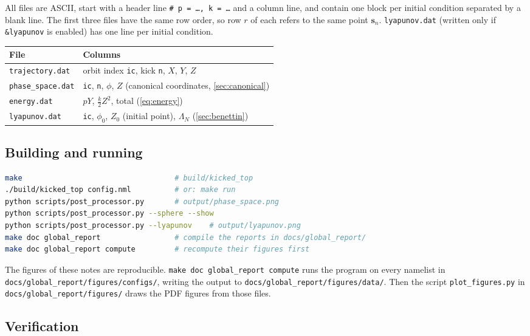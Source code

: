 \documentclass[11pt,a4paper]{article}
\newcommand{\vs}{\bm{s}}
\begin{document}
All files are ASCII, start with a header line \texttt{\# p = \dots, k = \dots} and a column line, and contain one
block per initial condition separated by a blank line. The first three files have the same row order, so row $r$ of
each refers to the same point $\vs_n$. \texttt{lyapunov.dat} (written only if \texttt{\&lyapunov} is enabled) has one line
per initial condition.
\begin{center}
\small
\begin{tabular}{ll}
  \toprule
  File & Columns \\
  \midrule
  \texttt{trajectory.dat} & orbit index \texttt{ic}, kick \texttt{n}, $X$, $Y$, $Z$ \\
  \texttt{phase\_space.dat} & \texttt{ic}, \texttt{n}, $\phi$, $Z$ \quad (canonical coordinates, \cref{sec:canonical}) \\
  \texttt{energy.dat} & $pY$, $\frac k2 Z^2$, total \quad (\cref{eq:energy}) \\
  \texttt{lyapunov.dat} & \texttt{ic}, $\phi_0$, $Z_0$ (initial point), $\Lambda_N$ \quad (\cref{sec:benettin}) \\
  \bottomrule
\end{tabular}
\end{center}

\subsection{Building and running}

\begin{lstlisting}[language=bash, numbers=none]
make                                   # build/kicked_top
./build/kicked_top config.nml          # or: make run
python scripts/post_processor.py       # output/phase_space.png
python scripts/post_processor.py --sphere --show
python scripts/post_processor.py --lyapunov    # output/lyapunov.png
make doc global_report                 # compile the reports in docs/global_report/
make doc global_report compute         # recompute their figures first
\end{lstlisting}
The figures of these notes are reproducible. \texttt{make doc global\_report compute} runs the program on every
namelist in \texttt{docs/global\_report/figures/configs/}, writing the output to
\texttt{docs/global\_report/figures/data/}. Then the script \texttt{plot\_figures.py} in
\texttt{docs/global\_report/figures/} draws the PDF figures from those files.

\subsection{Verification}
\end{document}
